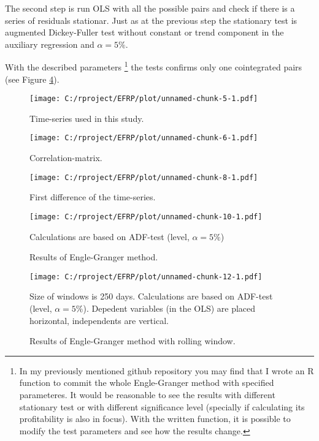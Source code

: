 \documentclass[12pt, a4paper, twoside, titlepage]{article}
\begin{document}
The second step is run OLS with all the possible pairs and check if there is a series of residuals stationar. Just as at the previous step the stationary test is augmented Dickey-Fuller test without constant or trend component in the auxiliary regression and $\alpha = 5\%$.

With the described parameters \footnote{In my previously mentioned github repository you may find that I wrote an R function to commit the whole Engle-Granger method with specified parameteres. It would be reasonable to see the results with different stationary test or with different significance level (specially if calculating its profitability is also in focus). With the written function, it is possible to modify the test parameters and see how the results change.} the tests confirms only one cointegrated pairs (see Figure \ref{fig4}). 

\begin{figure}[ht]
  \centering
  \texttt{[image: C:/rproject/EFRP/plot/unnamed-chunk-5-1.pdf]}
  \caption{Time-series used in this study.}
  \label{fig1}
\end{figure}

\begin{figure}[ht]
  \centering
  \texttt{[image: C:/rproject/EFRP/plot/unnamed-chunk-6-1.pdf]}
  \label{fig2}
  \caption{Correlation-matrix.}
\end{figure}

\begin{figure}[ht]
  \centering
  \texttt{[image: C:/rproject/EFRP/plot/unnamed-chunk-8-1.pdf]}
  \label{fig3}
  \caption{First difference of the time-series.}
\end{figure}

\begin{figure}[ht]
  \centering
  \texttt{[image: C:/rproject/EFRP/plot/unnamed-chunk-10-1.pdf]}
  \label{fig4}
  \caption{Results of Engle-Granger method.}
  Calculations are based on ADF-test (level, $\alpha = 5\%$)
\end{figure}

\begin{figure}[ht]
  \centering
  \texttt{[image: C:/rproject/EFRP/plot/unnamed-chunk-12-1.pdf]}
  \label{fig5}
  \caption{Results of Engle-Granger method with rolling window.}
  Size of windows is 250 days. Calculations are based on ADF-test (level, $\alpha = 5\%$). Depedent variables (in the OLS) are placed horizontal, independents are vertical.
\end{figure}
\end{document}
